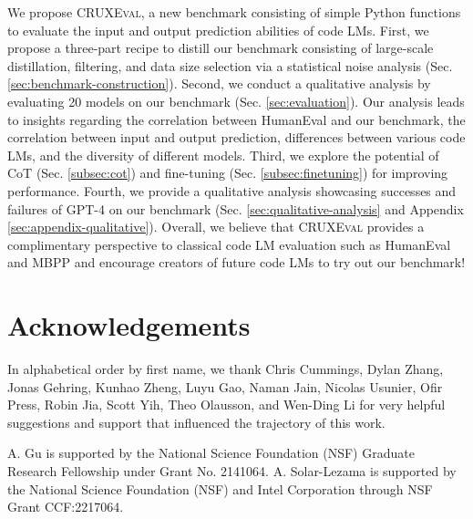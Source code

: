 \documentclass{article}
\newcommand{\benchmark}{\textsc{CRUXEval}\xspace}
\begin{document}
We propose \benchmark, a new benchmark consisting of simple Python functions to evaluate the input and output prediction abilities of code LMs. First, we propose a three-part recipe to distill our benchmark consisting of large-scale distillation, filtering, and data size selection via a statistical noise analysis (Sec. \ref{sec:benchmark-construction}). Second, we conduct a qualitative analysis by evaluating 20 models on our benchmark (Sec. \ref{sec:evaluation}). Our analysis leads to insights regarding the correlation between HumanEval and our benchmark, the correlation between input and output prediction, differences between various code LMs, and the diversity of different models. Third, we explore the potential of CoT (Sec. \ref{subsec:cot}) and fine-tuning (Sec. \ref{subsec:finetuning}) for improving performance. Fourth, we provide a qualitative analysis showcasing successes and failures of GPT-4 on our benchmark (Sec. \ref{sec:qualitative-analysis} and Appendix \ref{sec:appendix-qualitative}). Overall, we believe that \benchmark provides a complimentary perspective to classical code LM evaluation such as HumanEval and MBPP and encourage creators of future code LMs to try out our benchmark!

\section{Acknowledgements}
In alphabetical order by first name, we thank Chris Cummings, Dylan Zhang, Jonas Gehring, Kunhao Zheng, Luyu Gao, Naman Jain, Nicolas Usunier, Ofir Press, Robin Jia, Scott Yih, Theo Olausson, and Wen-Ding Li for very helpful suggestions and support that influenced the trajectory of this work.

A. Gu is supported by the National Science Foundation (NSF) Graduate Research Fellowship under Grant No. 2141064. A. Solar-Lezama is supported by the National Science Foundation (NSF) and Intel Corporation through NSF Grant CCF:2217064.


 

\begin{appendices}





\end{appendices}
\end{document}
